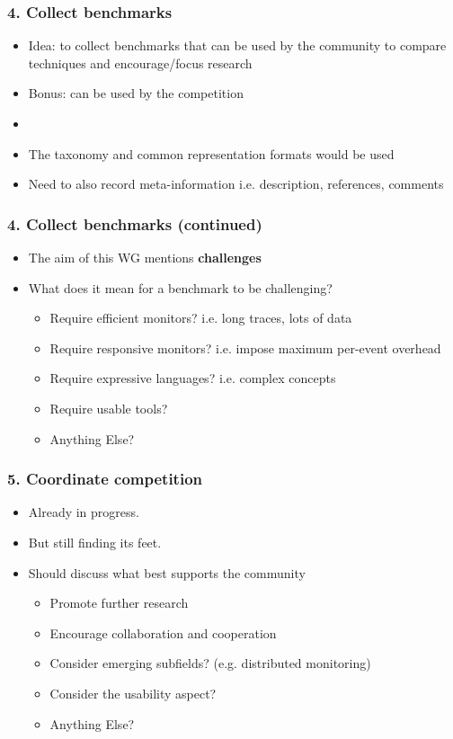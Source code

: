 \documentclass{beamer}
\newcommand{\addhere}{{\color{red} Anything Else?}}
\begin{document}
\begin{frame}
\frametitle{4. Collect benchmarks}
\begin{itemize}
	\item Idea: to collect benchmarks that can be used by the community to compare techniques and encourage/focus research
	\item Bonus: can be used by the competition
	\item[]
	\item The taxonomy and common representation formats would be used
	\item Need to also record meta-information i.e. description, references, comments
\end{itemize}
\end{frame}

\begin{frame}
\frametitle{4. Collect benchmarks (continued)}
\begin{itemize}
	\item The aim of this WG mentions {\bf challenges}
	\item What does it mean for a benchmark to be challenging?
	\begin{itemize}
		\item Require efficient monitors? i.e. long traces, lots of data
		\item Require responsive monitors? i.e. impose maximum per-event overhead
		\item Require expressive languages? i.e. complex concepts
		\item Require usable tools?
		\item \addhere{}
	\end{itemize}
\end{itemize}
\end{frame}

\begin{frame}
\frametitle{5. Coordinate competition}
\begin{itemize}
	\item Already in progress.
	\item But still finding its feet.
	\item Should discuss what best supports the community
	\begin{itemize}
		\item Promote further research
		\item Encourage collaboration and cooperation		
		\item Consider emerging subfields? (e.g. distributed monitoring)
		\item Consider the usability aspect?
		\item \addhere{}
	\end{itemize}
\end{itemize}
\end{frame}
\end{document}
